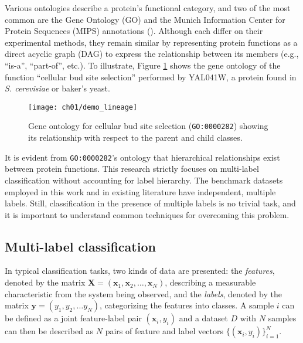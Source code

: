 \par Various ontologies describe a protein's functional category,
and two of the most common are the Gene Ontology (GO) and the Munich
Information Center for Protein Sequences (MIPS) annotations
(\cite{gaudet2017gene, mewes2006mips}). Although each differ on their
experimental methods, they remain similar by representing
protein functions as a direct acyclic graph (DAG) to express the relationship
between its members (e.g., ``is-a'', ``part-of'', etc.). To illustrate,
Figure \ref{demo:yeast_go} shows the gene ontology of the  function ``cellular
bud site selection'' performed by YAL041W, a protein found in
\textit{S. cerevisiae} or baker's yeast.

\begin{figure}[!t]
  \centering
  \texttt{[image: ch01/demo\_lineage]}
  \caption[Gene ontology for \texttt{GO:0000282} or "cellular bud site selection"]{
      Gene ontology for cellular bud site selection (\texttt{GO:0000282})
      showing its relationship with respect to the parent and child classes.
  }
  \label{demo:yeast_go}
\end{figure}

\par It is evident from \texttt{GO:0000282}'s ontology that hierarchical
relationships exist between protein functions. This research strictly
focuses on multi-label classification without accounting for label
hierarchy. The benchmark datasets employed in this work and in existing literature
have independent, multiple labels. Still, classification in the presence
of multiple labels is no trivial task, and it is important to understand common 
techniques for overcoming this problem.

\subsection{Multi-label classification}

\par In typical classification tasks, two kinds of data are presented:
the \textit{features}, denoted by the matrix $\mathbf{X} =
(\mathbf{x}_{1}, \mathbf{x}_{2}, \dots, \mathbf{x}_{N})$, describing
a measurable characteristic from the system being observed, and the
\textit{labels}, denoted by the matrix $\mathbf{y} = (y_{1}, y_{2}, \dots
y_{N})$, categorizing the features into classes. A sample $i$
can be defined as a joint feature-label pair $(\mathbf{x}_{i}, y_{i})$ and a
dataset $D$ with $N$ samples can then be described as $N$ pairs of feature
and label vectors  $\{(\mathbf{x}_{i}, y_{i})\}_{i=1}^{N}$.

